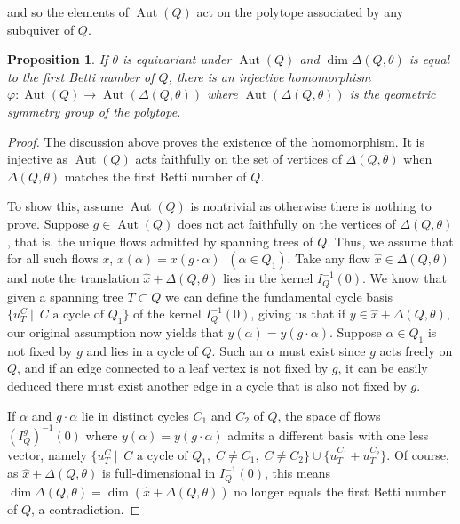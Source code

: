 \documentclass[11pt]{amsart}
\theoremstyle{plain}
\newtheorem{proposition}[theorem]{Proposition}
\theoremstyle{definition}
\DeclareMathOperator{\aut}{Aut}
\begin{document}
\noindent and so the elements of $\aut(Q)$ act on the polytope associated by any subquiver of $Q$.

\begin{proposition}
     If $\theta$ is equivariant under $\aut(Q)$ and $\dim \Delta(Q, \theta)$ is equal to the first Betti number of $Q$, there is an injective homomorphism  $\varphi : \aut(Q) \to \aut(\Delta(Q, \theta))$ where $\aut(\Delta(Q, \theta))$ is the geometric symmetry group of the polytope.
\end{proposition}

\begin{proof}
    The discussion above proves the existence of the homomorphism. It is injective as $\aut(Q)$ acts faithfully on the set of vertices of $\Delta(Q, \theta)$ when $\Delta(Q, \theta)$ matches the first Betti number of $Q$. 
    
    To show this, assume $\aut(Q)$ is nontrivial as otherwise there is nothing to prove. Suppose $g \in \aut(Q)$ does not act faithfully on the vertices of $\Delta(Q, \theta)$, that is, the unique flows admitted by spanning trees of $Q$. Thus, we assume that for all such flows $x$, $x(\alpha) = x(g \cdot \alpha) \;\; (\alpha \in Q_1)$. Take any flow $\hat{x} \in \Delta(Q, \theta)$ and note the translation $\hat{x} + \Delta(Q,\theta)$ lies in the kernel $I_Q^{-1}(0)$. We know that given a spanning tree $T \subset Q$ we can define the fundamental cycle basis $\{u^C_T \:|\:\; C \text{ a cycle of } Q_1\}$ of the kernel $I_Q^{-1}(0)$, giving us that if $y \in \hat{x} + \Delta(Q, \theta)$, our original assumption now yields that $y(\alpha) = y(g \cdot \alpha)$. Suppose $\alpha \in Q_1$ is not fixed by $g$ and lies in a cycle of $Q$. Such an $\alpha$ must exist since $g$ acts freely on $Q$, and if an edge connected to a leaf vertex is not fixed by $g$, it can be easily deduced there must exist another edge in a cycle that is also not fixed by $g$. 
    
    \color{red}{this next part aint always true, this is true sometimes if $g$ happens to only force 2 cycle basis vectors to be the same, but it can easily force more or all to be the same, reducing the dimension of the resulting space even further. Still a contradiction of course.}\color{black}
    
    If $\alpha$ and $g \cdot \alpha$ lie in distinct cycles $C_1$ and $C_2$ of $Q$, the space of flows $(I^g_Q)^{-1}(0)$ where $y(\alpha) = y(g \cdot \alpha)$ admits a different basis with one less vector, namely $\{u^C_T \:|\:\; C \text{ a cycle of } Q_1, \;C \neq C_1, \;C \neq C_2\} \cup \{u_T^{C_1} + u_T^{C_2}\}$. Of course, as $\hat{x} + \Delta(Q, \theta)$ is full-dimensional in $I_Q^{-1}(0)$, this means $\dim\Delta(Q, \theta) = \dim(\hat{x} + \Delta(Q, \theta))$ no longer equals the first Betti number of $Q$, a contradiction.


\end{proof}
\end{document}

